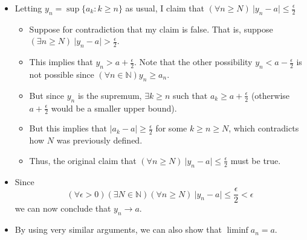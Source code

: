 \documentclass{article}
\begin{document}
\begin{itemize}
\begin{itemize}
\begin{itemize}
            \[
            (\forall \epsilon > 0)(\exists N \in \mathbb{N})(\forall n \ge N) \ \vert a_n - a \vert < \frac{\epsilon}{2}
            \]
            \item Letting $y_n = \sup \{ a_k : k \ge n \}$ as usual, I claim that $(\forall n \ge N) \ \vert y_n - a \vert \le \frac{\epsilon}{2}$
            \begin{itemize}
                \item Suppose for contradiction that my claim is false. That is, suppose $(\exists n \ge N) \ \vert y_n - a \vert > \frac{\epsilon}{2}$.
                \item This implies that $y_n > a + \frac{\epsilon}{2}$. Note that the other possibility $y_n < a - \frac{\epsilon}{2}$ is not possible since $(\forall n \in \mathbb{N}) y_n \ge a_n$.
                \item But since $y_n$ is the supremum, $\exists k \ge n$ such that $a_k \ge a + \frac{\epsilon}{2}$ (otherwise $a + \frac{\epsilon}{2}$ would be a smaller upper bound).
                \item But this implies that $\vert a_k - a \vert \ge \frac{\epsilon}{2}$ for some $k \ge n \ge N$, which contradicts how $N$ was previously defined.
                \item Thus, the original claim that $(\forall n \ge N) \ \vert y_n - a \vert \le \frac{\epsilon}{2}$ must be true.
            \end{itemize}
            \item Since
            \[
            (\forall \epsilon > 0)(\exists N \in \mathbb{N})(\forall n \ge N) \ \vert y_n - a \vert \le \frac{\epsilon}{2} < \epsilon
            \]
            we can now conclude that $y_n \rightarrow a$.
            \item By using very similar arguments, we can also show that $\liminf a_n = a$.
        \end{itemize}
    \end{itemize}
\end{itemize}
\end{document}
